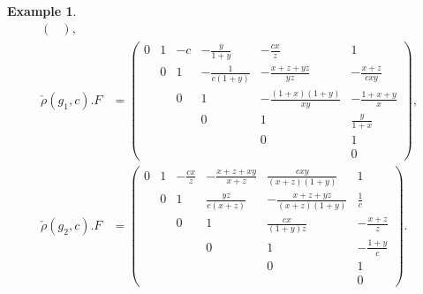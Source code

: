 \documentclass[11pt]{amsart}
\theoremstyle{plain}
\theoremstyle{definition}
\newtheorem{example}[proposition]{Example}
\theoremstyle{remark}
\begin{document}
\begin{example}
\begin{align*}
\begin{pmatrix}
        \end{pmatrix}, \\
    \check{\rho}(g_1,c).F &= \begin{pmatrix}
            0 & 1 & -c & -\frac{y}{1+y} & -\frac{cx}{z} & 1 \\
            & 0 & 1 & -\frac{1}{c(1+y)} & -\frac{x+z+yz}{yz} & -\frac{x+z}{cxy} \\
            && 0 & 1 & -\frac{(1+x)(1+y)}{xy} & -\frac{1+x+y}{x} \\
            &&& 0 & 1 & \frac{y}{1+x} \\
            &&&& 0 & 1\\
        &&&&& 0
        \end{pmatrix}, \\
    \check{\rho}(g_2,c).F &= \begin{pmatrix}
            0 & 1 & -\frac{cx}{z} & -\frac{x+z+xy}{x+z} & \frac{cxy}{(x+z)(1+y)} & 1 \\
            & 0 & 1 & \frac{yz}{c(x+z)} & -\frac{x+z+yz}{(x+z)(1+y)} & \frac{1}{c} \\
            && 0 & 1 & \frac{cx}{(1+y)z} & -\frac{x+z}{z} \\
            &&& 0 & 1 & -\frac{1+y}{c} \\
            &&&& 0 & 1\\
        &&&&& 0
        \end{pmatrix}.
\end{align*}
\end{example}

\end{document}
